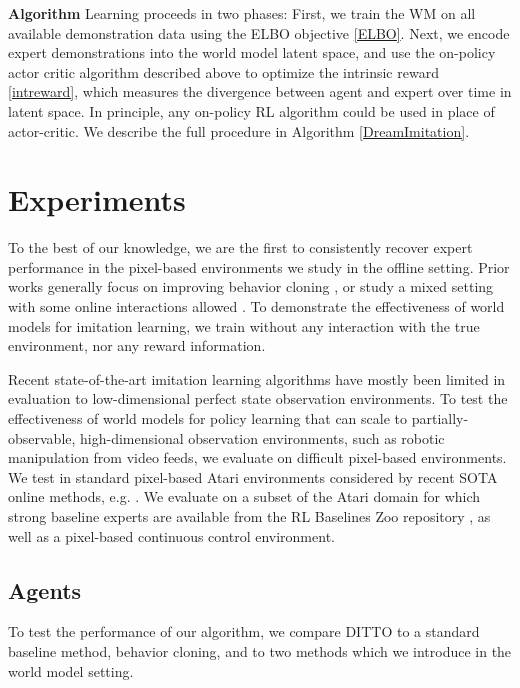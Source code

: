 \documentclass[10pt]{article} %
\theoremstyle{plain}
\theoremstyle{definition}
\theoremstyle{remark}
\begin{document}
\textbf{Algorithm}\hspace{0.3cm} Learning proceeds in two phases: First, we train the WM on all available demonstration data using the ELBO objective \ref{ELBO}. Next, we encode expert demonstrations into the world model latent space, and use the on-policy actor critic algorithm described above to optimize the intrinsic reward \ref{intreward}, which measures the divergence between agent and expert over time in latent space. In principle, any on-policy RL algorithm could be used in place of actor-critic. We describe the full procedure in Algorithm \ref{DreamImitation}.







\section{Experiments}
To the best of our knowledge, we are the first to consistently recover expert performance in the pixel-based environments we study in the offline setting. Prior works generally focus on improving behavior cloning \citep{noisybc}, or study a mixed setting with some online interactions allowed \citep{vmail} \citep{mobile}. To demonstrate the effectiveness of world models for imitation learning, we train without any interaction with the true environment, nor any reward information.

Recent state-of-the-art imitation learning algorithms \citep{noisybc} \citep{DemoDICE} \citep{ValueDICE} have mostly been limited in evaluation to low-dimensional perfect state observation environments. To test the effectiveness of world models for policy learning that can scale to partially-observable, high-dimensional observation environments, such as robotic manipulation from video feeds, we evaluate on difficult pixel-based environments. We test in standard pixel-based Atari environments considered by recent SOTA online methods, e.g. \cite{DRIL} \citep{sqil}. We evaluate on a subset of the Atari domain for which strong baseline experts are available from the RL Baselines Zoo repository \citep{rl-zoo3}, as well as a pixel-based continuous control environment.


\subsection{Agents}
To test the performance of our algorithm, we compare DITTO to a standard baseline method, behavior cloning, and to two methods which we introduce in the world model setting.
\end{document}
